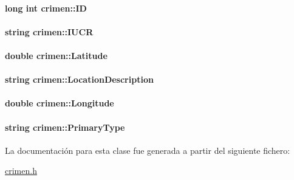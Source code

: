 \hypertarget{classcrimen_a59702f88f0b0c25781ae3d296790dcb8}{
\paragraph[{I\-D}]{\setlength{\rightskip}{0pt plus 5cm}long int crimen\-::\-I\-D\hspace{0.3cm}{\ttfamily [private]}}}\label{classcrimen_a59702f88f0b0c25781ae3d296790dcb8}
\hypertarget{classcrimen_a064e0e02109feaea19f254ef47a2510c}{
\paragraph[{I\-U\-C\-R}]{\setlength{\rightskip}{0pt plus 5cm}string crimen\-::\-I\-U\-C\-R\hspace{0.3cm}{\ttfamily [private]}}}\label{classcrimen_a064e0e02109feaea19f254ef47a2510c}
\hypertarget{classcrimen_adaf728df1dacff5a93678d3feb512b7f}{
\paragraph[{Latitude}]{\setlength{\rightskip}{0pt plus 5cm}double crimen\-::\-Latitude\hspace{0.3cm}{\ttfamily [private]}}}\label{classcrimen_adaf728df1dacff5a93678d3feb512b7f}
\hypertarget{classcrimen_a221f7065c470883388174f19ea34d1f3}{
\paragraph[{Location\-Description}]{\setlength{\rightskip}{0pt plus 5cm}string crimen\-::\-Location\-Description\hspace{0.3cm}{\ttfamily [private]}}}\label{classcrimen_a221f7065c470883388174f19ea34d1f3}
\hypertarget{classcrimen_a9ffd3c64d12cc4b963b890b8db645964}{
\paragraph[{Longitude}]{\setlength{\rightskip}{0pt plus 5cm}double crimen\-::\-Longitude\hspace{0.3cm}{\ttfamily [private]}}}\label{classcrimen_a9ffd3c64d12cc4b963b890b8db645964}
\hypertarget{classcrimen_acc4a8a9f688d306a38519899a8c325a7}{
\paragraph[{Primary\-Type}]{\setlength{\rightskip}{0pt plus 5cm}string crimen\-::\-Primary\-Type\hspace{0.3cm}{\ttfamily [private]}}}\label{classcrimen_acc4a8a9f688d306a38519899a8c325a7}


La documentación para esta clase fue generada a partir del siguiente fichero\-:\begin{DoxyCompactItemize}
\item 
\hyperlink{crimen_8h}{crimen.\-h}\end{DoxyCompactItemize}
